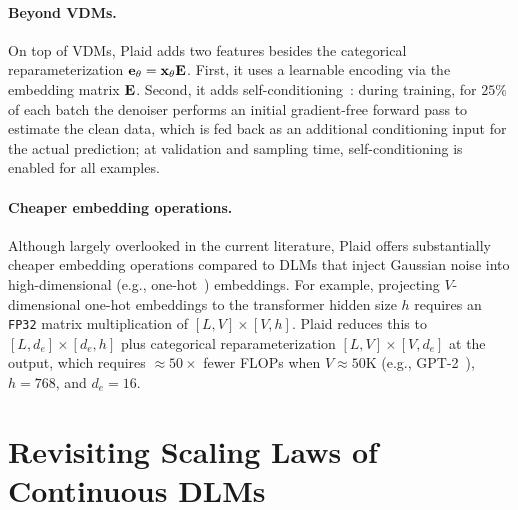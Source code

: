 \documentclass{article}
\begin{document}
%

%
%
%
%
%
%

\paragraph{Beyond VDMs.} On top of VDMs, Plaid adds two features besides the categorical reparameterization ${\mathbf e}_\theta = {\mathbf x}_\theta {\mathbf E}$. First, it uses a learnable encoding via the embedding matrix ${\mathbf E}$. Second, it adds self-conditioning~\citep{chen2023analog}: during training, for $25\%$ of each batch the denoiser performs an initial gradient-free forward pass to estimate the clean data, which is fed back as an additional conditioning input for the actual prediction; at validation and sampling time, self-conditioning is enabled for all examples.

\paragraph{Cheaper embedding operations.} Although largely overlooked in the current literature, Plaid offers substantially cheaper embedding operations compared to DLMs that inject Gaussian noise into high-dimensional (e.g., one-hot~\citep{lee2026flow, roos2026categorical, potaptchik2026discrete}) embeddings. For example, projecting $V$-dimensional one-hot embeddings to the transformer hidden size $h$ requires an \texttt{FP32} matrix multiplication of $[L, V] \times [V, h]$. Plaid reduces this to $[L, d_e] \times [d_e, h]$ plus categorical reparameterization $[L, V] \times [V, d_e]$ at the output, which requires $\approx50\times$ fewer FLOPs when $V\approx50$K (e.g., GPT-2~\citep{radford2019language}), $h=768$, and $d_e=16$.
%


%

%



%

%







%








\section{Revisiting Scaling Laws of Continuous DLMs}
\label{sec:scaling}

%
\end{document}
